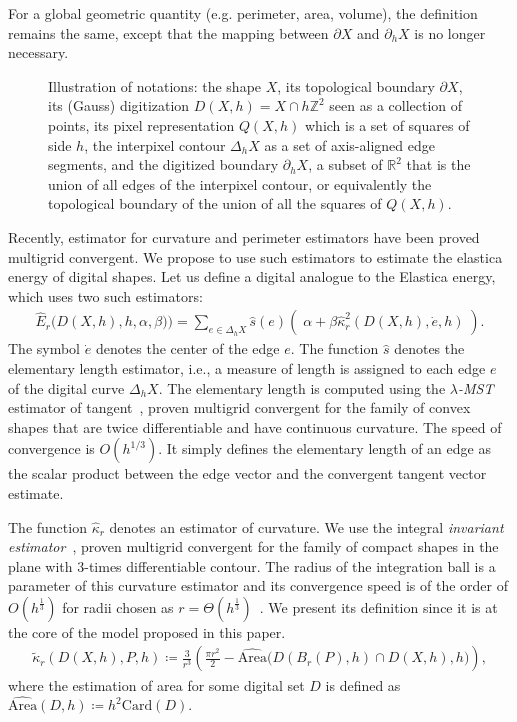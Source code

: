 \documentclass[review]{siamart220329}
\newcommand{\R}{\mathbb{R}}
\newcommand{\Z}{\mathbb{Z}}
\newcommand{\digset}{D} %
\begin{document}
For a global geometric quantity (e.g. perimeter, area, volume), the definition
remains the same, except that the mapping between $\partial X$ and $\partial_h
X$ is no longer necessary.

\begin{figure}
  
  \caption{
   Illustration of notations: the shape $X$, its topological boundary $\partial
   X$, its (Gauss) digitization $D(X,h)=X \cap h \Z^2$ seen as a collection of
   points, its pixel representation $Q(X,h)$ which is a set of squares of side
   $h$, the interpixel contour $\Delta_h X$ as a set of axis-aligned edge
   segments, and the digitized boundary $\partial_h X$, a subset of $\R^2$ that
   is the union of all edges of the interpixel contour, or equivalently the
   topological boundary of the union of all the squares of
   $Q(X,h)$.\label{fig-notations}}
\end{figure}

Recently, estimator for curvature and perimeter estimators have been proved
multigrid convergent. We propose to use such estimators to estimate the elastica
energy of digital shapes. Let us define a digital analogue to the Elastica
energy, which uses two such estimators:
%
%
\begin{align}
    \hat{E}_r\big( D(X,h),h,\alpha,\beta) \big) = \sum_{e \in \Delta_h X}{
    \hat{s}(e)\left(\; \alpha + \beta \hat{\kappa}_{r}^2(D(X,h),\dot{e},h)
    \; \right)}.
	\label{eq:digital-energy}
\end{align}
%
%
The symbol $\dot{e}$ denotes the center of the edge $e$.  The function $\hat{s}$
denotes the elementary length estimator, i.e., a measure of length is assigned
to each edge $e$ of the digital curve $\Delta_h X$. The elementary length is
computed using the \emph{$\lambda$-MST} estimator of
tangent~\cite{lachaud07tangent,lachaud06hdr}, proven multigrid convergent for
the family of convex shapes that are twice differentiable and have continuous
curvature. The speed of convergence is $O(h^{1/3})$. It simply defines the
elementary length of an edge as the scalar product between the edge vector and
the convergent tangent vector estimate.

The function $\hat{\kappa} _r$ denotes an estimator of curvature. We use the
integral \emph{invariant estimator}~\cite{coeurjolly13integral}, proven
multigrid convergent for the family of compact shapes in the plane with
$3$-times differentiable contour. The radius of the integration ball is a
parameter of this curvature estimator and its convergence speed is of the order
of $O(h^{\frac{1}{3}})$ for radii chosen as $r=\Theta
(h^{\frac{1}{3}})$~\cite{lachaud2017robust}. We present its definition since it
is at the core of the model proposed in this paper.
%
%
\begin{align}
  \tilde{\kappa}_r(D(X,h),P,h) \coloneqq \frac{3}{r^3}\left( \frac{\pi r^2}{2} -
  \widehat{\text{Area}}\big( D(B_r(P),h) \cap D(X,h),h\big) \right),
  \label{eq:curvature_approximation}
\end{align}
%
%
where the estimation of area for some digital set $\digset$ is defined as
$\widehat{\text{Area}}(\digset,h) \coloneqq h^2\text{Card}\left( \digset \right).$ 
\end{document}
